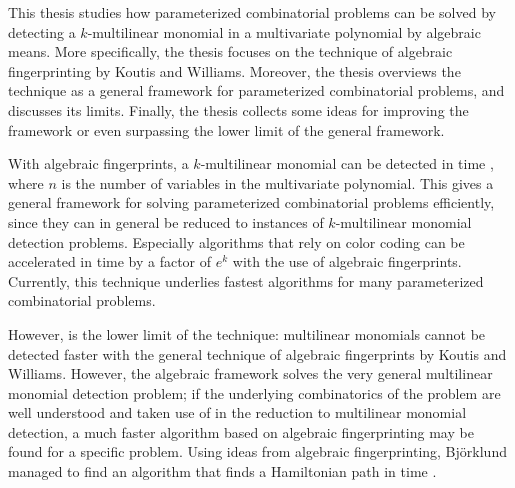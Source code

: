 %
%

\begin{enabstract}
  This thesis studies how parameterized combinatorial problems can be 
  solved by detecting a $k$-multilinear monomial in a multivariate polynomial 
  by algebraic means. More specifically, the thesis focuses on the technique 
  of algebraic fingerprinting by Koutis and Williams. Moreover, the thesis 
  overviews the technique as a general framework for parameterized combinatorial 
  problems, and discusses its limits. Finally, the thesis collects some ideas 
  for improving the framework or even surpassing the lower limit of the 
  general framework.

  With algebraic fingerprints, a $k$-multilinear monomial can be detected 
  in time , where $n$ is the number of variables in the 
  multivariate polynomial. This gives a general framework for solving parameterized 
  combinatorial problems efficiently, since they can in general be reduced to
  instances of $k$-multilinear 
  monomial detection problems. 
  Especially algorithms that rely on color coding can be accelerated in time 
  by a factor of $e^k$ with the use of algebraic fingerprints. Currently, 
  this technique underlies fastest algorithms 
  for many parameterized combinatorial problems. 

  However,  is the lower limit of the technique: 
  multilinear monomials cannot be detected faster 
  with the general technique of algebraic fingerprints by Koutis and Williams. 
  However, the algebraic framework solves the very general multilinear monomial 
  detection problem; if the underlying combinatorics of the problem are well understood 
  and taken use of in the reduction to multilinear monomial detection, 
  a much faster algorithm based on algebraic fingerprinting may be 
  found for a specific problem. Using ideas from algebraic fingerprinting, 
  Björklund managed to find an algorithm that 
  finds a Hamiltonian path in time .
%
\end{enabstract}
